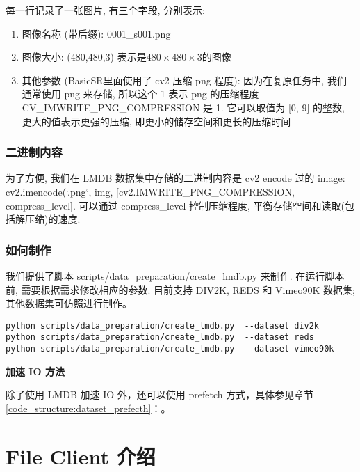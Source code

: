 \documentclass[../main.tex]{subfiles}
\begin{document}
每一行记录了一张图片, 有三个字段, 分别表示:
\begin{enumerate}
    \item 图像名称 (带后缀): 0001\_s001.png
    \item 图像大小: (480,480,3) 表示是$480\times480\times3$的图像
    \item 其他参数 (BasicSR里面使用了 cv2 压缩 png 程度): 因为在复原任务中, 我们通常使用 png 来存储, 所以这个 1 表示 png 的压缩程度
          CV\_IMWRITE\_PNG\_COMPRESSION 是 1. 它可以取值为 [0, 9] 的整数, 更大的值表示更强的压缩, 即更小的储存空间和更长的压缩时间
\end{enumerate}

\subsubsection{二进制内容}

为了方便, 我们在 LMDB 数据集中存储的二进制内容是 cv2 encode 过的 image: cv2.imencode(`.png`, img, [cv2.IMWRITE\_PNG\_COMPRESSION, compress\_level]. 可以通过 compress\_level 控制压缩程度, 平衡存储空间和读取(包括解压缩)的速度.

\subsubsection{如何制作}

我们提供了脚本 \href{https://github.com/XPixelGroup/BasicSR/blob/master/scripts/data_preparation/create_lmdb.py}{scripts/data\_preparation/create\_lmdb.py} 来制作. 在运行脚本前, 需要根据需求修改相应的参数. 目前支持 DIV2K, REDS 和 Vimeo90K 数据集; 其他数据集可仿照进行制作。

\begin{verbatim}
python scripts/data_preparation/create_lmdb.py  --dataset div2k
python scripts/data_preparation/create_lmdb.py  --dataset reds
python scripts/data_preparation/create_lmdb.py  --dataset vimeo90k
\end{verbatim}

\begin{note} %
    \textbf{加速 IO 方法}

    除了使用 LMDB 加速 IO 外，还可以使用 prefetch 方式，具体参见章节\ref{code_structure:dataset_prefecth}：。
\end{note}

\section{File Client 介绍}\label{data_preparation:file_client}
\end{document}
